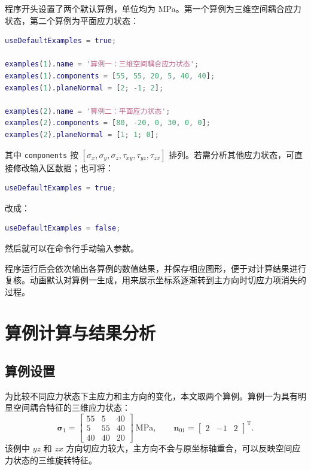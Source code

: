 \documentclass[UTF8,a4paper,12pt]{ctexart}
\newcommand{\stress}{\bm{\sigma}}
\newcommand{\vect}[1]{\bm{#1}}
\begin{document}
程序开头设置了两个默认算例，单位均为 MPa。第一个算例为三维空间耦合应力状态，第二个算例为平面应力状态：
\begin{lstlisting}[language=Matlab]
useDefaultExamples = true;

examples(1).name = '算例一：三维空间耦合应力状态';
examples(1).components = [55, 55, 20, 5, 40, 40];
examples(1).planeNormal = [2; -1; 2];

examples(2).name = '算例二：平面应力状态';
examples(2).components = [80, -20, 0, 30, 0, 0];
examples(2).planeNormal = [1; 1; 0];
\end{lstlisting}

其中 \verb|components| 按
$[\sigma_x,\sigma_y,\sigma_z,\tau_{xy},\tau_{yz},\tau_{zx}]$
排列。若需分析其他应力状态，可直接修改输入区数据；也可将：
\begin{lstlisting}[language=Matlab]
useDefaultExamples = true;
\end{lstlisting}
改成：
\begin{lstlisting}[language=Matlab]
useDefaultExamples = false;
\end{lstlisting}

然后就可以在命令行手动输入参数。

程序运行后会依次输出各算例的数值结果，并保存相应图形，便于对计算结果进行复核。动画默认对算例一生成，用来展示坐标系逐渐转到主方向时切应力项消失的过程。

\section{算例计算与结果分析}

\subsection{算例设置}

为比较不同应力状态下主应力和主方向的变化，本文取两个算例。算例一为具有明显空间耦合特征的三维应力状态：
\begin{equation}
\stress_1 =
\begin{bmatrix}
55 & 5 & 40 \\
5 & 55 & 40 \\
40 & 40 & 20
\end{bmatrix}\ \mathrm{MPa},\qquad
\vect n_{01}=\begin{bmatrix}2 & -1 & 2\end{bmatrix}^{\mathrm T}.
\end{equation}
该例中 $yz$ 和 $zx$ 方向切应力较大，主方向不会与原坐标轴重合，可以反映空间应力状态的三维旋转特征。
\end{document}
